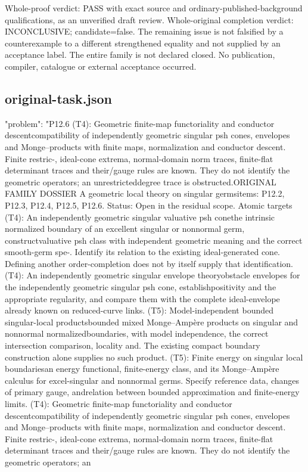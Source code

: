 \documentclass[11pt]{article}
\begin{document}
\begin{GrantData}
Whole-proof verdict: PASS with exact source and ordinary-published-background qualifications, as an unverified draft review. Whole-original completion verdict: INCONCLUSIVE; candidate=false. The remaining issue is not falsified by a counterexample to a different strengthened equality and not supplied by an acceptance label. The entire family is not declared closed. No publication, compiler, catalogue or external acceptance occurred.

\end{GrantData}
\subsection*{original-task.json}
\begin{GrantData}
{
  "problem": "P12.6 (T4): Geometric ﬁnite-map functoriality and conductor descent\nEstablish compatibility of independently geometric singular psh cones, envelopes and Monge– products with ﬁnite maps, normalization and conductor descent. Finite restric-\ntion, ideal-cone extrema, normal-domain norm traces, ﬁnite-ﬂat determinant traces and their\ntower/gauge rules are known. They do not identify the geometric operators; an unrestricted\ncontinuous degree trace is obstructed.\n\nENTIRE ORIGINAL FAMILY DOSSIER     A geometric local theory on singular germs\nActive items: P12.2, P12.3, P12.4, P12.5, P12.6. Status: Open in the residual scope.\n{}   Atomic targets (T4): An independently geometric singular valuative psh cone\nOn the intrinsic normalized boundary of an excellent singular or nonnormal germ, construct\na valuative psh class with independent geometric meaning and the correct smooth-germ spe-\ncialization. Identify its relation to the existing ideal-generated cone. Deﬁning another order-\ntheoretic completion does not by itself supply that identiﬁcation.\n{} (T4): An independently geometric singular envelope theory\nConstruct obstacle envelopes for the independently geometric singular psh cone, establish\ntheir positivity and the appropriate regularity, and compare them with the complete ideal-\npsh envelope already known on reduced-curve links.\n{} (T5): Model-independent bounded singular-local products\nConstruct bounded mixed Monge–Ampère products on singular and nonnormal normalized\nlocal boundaries, with model independence, the correct intersection comparison, locality and\ncontinuity. The existing compact boundary construction alone supplies no such product.\n{} (T5): Finite energy on singular local boundaries\nConstruct an energy functional, ﬁnite-energy class, and its Monge–Ampère calculus for excel-\nlent singular and nonnormal germs. Specify reference data, changes of primary gauge, and\nthe relation between bounded approximation and ﬁnite-energy limits.\n{} (T4): Geometric ﬁnite-map functoriality and conductor descent\nEstablish compatibility of independently geometric singular psh cones, envelopes and Monge– products with ﬁnite maps, normalization and conductor descent. Finite restric-\ntion, ideal-cone extrema, normal-domain norm traces, ﬁnite-ﬂat determinant traces and their\ntower/gauge rules are known. They do not identify the geometric operators; an }
\end{GrantData}
\end{document}

